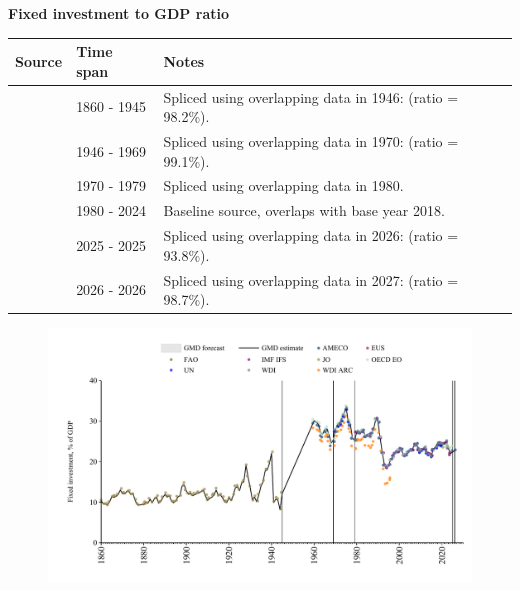 \documentclass[12pt,a4paper,landscape]{article}
\begin{document}
\begin{adjustbox}{max totalsize={\paperwidth}{\paperheight},center}
\begin{minipage}[t][\textheight][t]{\textwidth}
\vspace*{0.5cm}
{}
\begin{center}
{\Large\bfseries Fixed investment to GDP ratio}
\end{center}
\vspace{0.5cm}
\begin{table}[H]
\centering
\small
\begin{tabular}{|l|l|l|}
\hline
\textbf{Source} & \textbf{Time span} & \textbf{Notes} \\
\hline
\rowcolor{white}\cite{JO}& 1860 - 1945 &Spliced using overlapping data in 1946: (ratio = 98.2\%). \\
\rowcolor{lightgray}\cite{OECD_EO}& 1946 - 1969 &Spliced using overlapping data in 1970: (ratio = 99.1\%). \\
\rowcolor{white}\cite{WDI}& 1970 - 1979 &Spliced using overlapping data in 1980. \\
\rowcolor{lightgray}\cite{EUS}& 1980 - 2024 &Baseline source, overlaps with base year 2018. \\
\rowcolor{white}\cite{OECD_EO}& 2025 - 2025 &Spliced using overlapping data in 2026: (ratio = 93.8\%). \\
\rowcolor{lightgray}\cite{AMECO}& 2026 - 2026 &Spliced using overlapping data in 2027: (ratio = 98.7\%). \\
\hline
\end{tabular}
\end{table}
\begin{figure}[H]
\centering
\includegraphics[width=\textwidth,height=0.6\textheight,keepaspectratio]{graphs/FIN_finv_GDP.pdf}
\end{figure}
\end{minipage}
\end{adjustbox}
\end{document}
